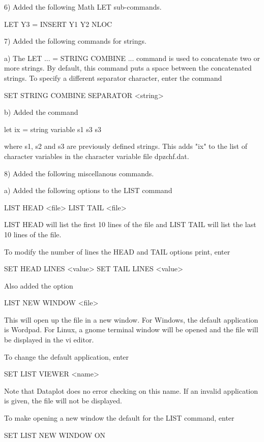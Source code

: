  6) Added the following Math LET sub-commands.

      LET Y3 = INSERT Y1 Y2 NLOC

 7) Added the following commands for strings.

    a) The LET ... = STRING COMBINE ... command is used to concatenate 
       two or more strings.  By default, this command puts a space
       between the concatenated strings.  To specify a different 
       separator character, enter the command

           SET STRING COMBINE SEPARATOR <string>

    b) Added the command

          let ix = string variable s1 s3 s3

       where s1, s2 and s3 are previously defined strings.  This adds
       "ix" to the list of character variables in the character variable
       file dpzchf.dat.

 8) Added the following miscellanous commands.

    a) Added the following options to the LIST command

          LIST HEAD <file>
          LIST TAIL <file>

       LIST HEAD will list the first 10 lines of the file and LIST TAIL
       will list the last 10 lines of the file.

       To modify the number of lines the HEAD and TAIL options print,
       enter

          SET HEAD LINES <value>
          SET TAIL LINES <value>

       Also added the option

          LIST NEW WINDOW <file>

       This will open up the file in a new window.  For Windows, the
       default application is Wordpad.  For Linux, a gnome terminal window
       will be opened and the file will be displayed in the vi editor.

       To change the default application, enter

          SET LIST VIEWER <name>

       Note that Dataplot does no error checking on this name.  If
       an invalid application is given, the file will not be displayed.

       To make opening a new window the default for the LIST command,
       enter

          SET LIST NEW WINDOW ON

